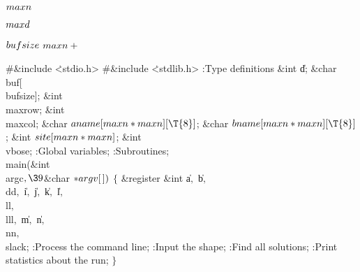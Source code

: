 \Y\B\4\D$\\{maxn}$ \5
\par
\B\4\D$\\{maxd}$ \5
\par
\B\4\D$\\{bufsize}$ \5
$\\{maxn}+{}$\par
\Y\B\8\#\&{include} \.{<stdio.h>}\6
\8\#\&{include} \.{<stdlib.h>}\6
:Type definitions\X\7
\&{int} \|d;\6
\&{char} \\{buf}[\\{bufsize}];\6
\&{int} \\{maxrow};\6
\&{int} \\{maxcol};\6
\&{char} ${}\\{aname}[\\{maxn}*\\{maxn}][\T{8}]{}$;\6
\&{char} ${}\\{bname}[\\{maxn}*\\{maxn}][\T{8}]{}$;\6
\&{int} ${}\\{site}[\\{maxn}*\\{maxn}]{}$;\6
\&{int} \\{vbose};\7
:Global variables\X;\6
:Subroutines\X;\7
\\{main}(\&{int} \\{argc}${},\39{}$\&{char} ${}{*}\\{argv}[\,]){}$\1\1\2\2\6
${}\{{}$\1\6
\&{register} \&{int} \|a${},{}$ \|b${},{}$ \\{dd}${},{}$ \|i${},{}$ \|j${},{}$ %
\|k${},{}$ \|l${},{}$ \\{ll}${},{}$ \\{lll}${},{}$ \|m${},{}$ \|n${},{}$ %
\\{nn}${},{}$ \\{slack};\7
:Process the command line\X;\6
:Input the shape\X;\6
:Find all solutions\X;\6
:Print statistics about the run\X;\6
\4${}\}{}$\2\par
\fi

